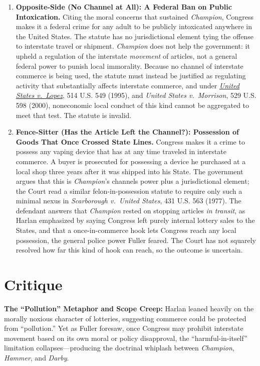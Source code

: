 \documentclass[12pt]{article}
\begin{document}
\begin{enumerate}
\item \textbf{Opposite-Side (No Channel at All): A Federal Ban on Public Intoxication.} Citing the moral concerns that sustained \textit{Champion}, Congress makes it a federal crime for any adult to be publicly intoxicated anywhere in the United States. The statute has no jurisdictional element tying the offense to interstate travel or shipment. \textit{Champion} does not help the government: it upheld a regulation of the interstate \emph{movement} of articles, not a general federal power to punish local immorality. Because no channel of interstate commerce is being used, the statute must instead be justified as regulating activity that substantially affects interstate commerce, and under \href{https://supreme.justia.com/cases/federal/us/514/549/}{\textit{United States v.\ Lopez}}, 514 U.S. 549 (1995), and \textit{United States v.\ Morrison}, 529 U.S. 598 (2000), noneconomic local conduct of this kind cannot be aggregated to meet that test. The statute is invalid.

\item \textbf{Fence-Sitter (Has the Article Left the Channel?): Possession of Goods That Once Crossed State Lines.} Congress makes it a crime to possess any vaping device that has at any time traveled in interstate commerce. A buyer is prosecuted for possessing a device he purchased at a local shop three years after it was shipped into his State. The government argues that this is \textit{Champion}'s channels power plus a jurisdictional element; the Court read a similar felon-in-possession statute to require only such a minimal nexus in \textit{Scarborough v.\ United States}, 431 U.S. 563 (1977). The defendant answers that \textit{Champion} rested on stopping articles \emph{in transit}, as Harlan emphasized by saying Congress left purely internal lottery sales to the States, and that a once-in-commerce hook lets Congress reach any local possession, the general police power Fuller feared. The Court has not squarely resolved how far this kind of hook can reach, so the outcome is uncertain.

\end{enumerate}

\section{Critique}
\textbf{The ``Pollution'' Metaphor and Scope Creep:} Harlan leaned heavily on the morally noxious character of lotteries, suggesting commerce could be protected from ``pollution.'' Yet as Fuller foresaw, once Congress may prohibit interstate movement based on its own moral or policy disapproval, the ``harmful-in-itself'' limitation collapses---producing the doctrinal whiplash between \textit{Champion}, \textit{Hammer}, and \textit{Darby}.
\end{document}
